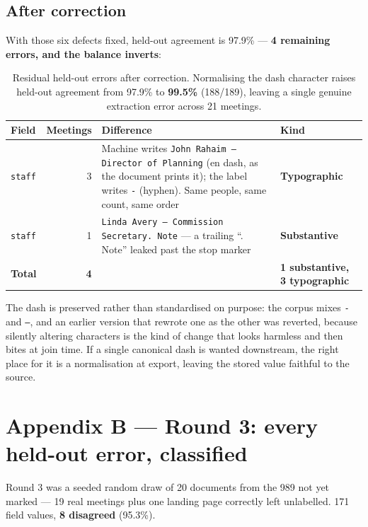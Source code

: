 \documentclass[11pt]{article}
\begin{document}
\subsection*{After correction}

With those six defects fixed, held-out agreement is 97.9\% --- \textbf{4 remaining errors,
and the balance inverts}:

\begin{table}[h]
\centering
\begin{tabular}{p{}rp{}p{}}
\toprule
Field & Meetings & Difference & Kind \\
\midrule
\texttt{staff} & 3 & Machine writes \texttt{John Rahaim – Director of Planning} (en dash,
as the document prints it); the label writes \texttt{-} (hyphen). Same people, same count,
same order & \textbf{Typographic} \\
\texttt{staff} & 1 & \texttt{Linda Avery – Commission Secretary. Note} --- a trailing
``. Note'' leaked past the stop marker & \textbf{Substantive} \\
\midrule
\textbf{Total} & \textbf{4} & & \textbf{1 substantive, 3 typographic} \\
\bottomrule
\end{tabular}
\caption{Residual held-out errors after correction. Normalising the dash character raises
held-out agreement from 97.9\% to \textbf{99.5\%} (188/189), leaving a single genuine
extraction error across 21 meetings.}
\end{table}

\noindent
The dash is preserved rather than standardised on purpose: the corpus mixes \texttt{-} and
\texttt{–}, and an earlier version that rewrote one as the other was reverted, because
silently altering characters is the kind of change that looks harmless and then bites at
join time. If a single canonical dash is wanted downstream, the right place for it is a
normalisation at export, leaving the stored value faithful to the source.


\section{Appendix B --- Round 3: every held-out error, classified}

Round 3 was a seeded random draw of 20 documents from the 989 not yet marked --- 19 real
meetings plus one landing page correctly left unlabelled. 171 field values, \textbf{8
disagreed} (95.3\%).
\end{document}
